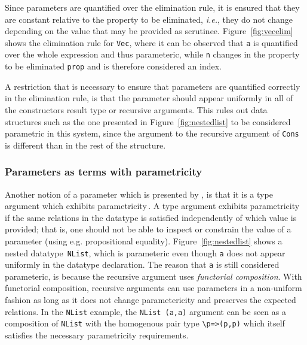 \documentclass{ituthesis}
\newcommand{\ttconstructor}[1]{\textcolor{constructor-color}{\texttt{#1}}}
\newcommand{\tttype}[1]{\textcolor{type-color}{\texttt{#1}}}
\newcommand{\ttvar}[1]{\textcolor{local-var-color}{\texttt{#1}}}
\theoremstyle{break}
\begin{document}
Since parameters are quantified over the elimination rule, it is ensured that they are constant relative to the property to be eliminated, \textit{i.e.}, they do not change depending on the value that may be provided as scrutinee.
Figure~\ref{fig:vecelim} shows the elimination rule for \tttype{Vec}, where it can be observed that \ttvar{a} is quantified over the whole expression and thus parameteric,
while \ttvar{n} changes in the property to be eliminated \ttvar{prop} and is therefore considered an index.

A restriction that is necessary to ensure that parameters are quantified correctly in the elimination rule, is that the parameter should appear uniformly in all of the constructors result type or recursive arguments.
This rules out data structures such as the one presented in Figure~\ref{fig:nestedlist} to be considered parametric in this system, since the argument to the recursive argument of \ttconstructor{Cons} is different
than in the rest of the structure.

\subsubsection{Parameters as terms with parametricity}
\label{ssub:Parameters as terms with parametricity}
Another notion of a parameter which is presented by \textcite{bernardy2010parametricity}, is that it is a type argument which exhibits parametricity\,\autocite{DBLP:conf/ifip/Reynolds83,Wadler89theoremsfor}.
A type argument exhibits parametricity if the same relations in the datatype is satisfied independently of which value is provided; that is, one should not be able to inspect or constrain the value of a parameter (using e.g. propositional equality).
Figure~\ref{fig:nestedlist} shows a nested datatype\,\autocite{bird1998nested} \tttype{NList}, which is parameteric even though \ttvar{a} does not appear uniformly in the datatype declaration.
The reason that \ttvar{a} is still considered parameteric, is because the recursive argument uses \textit{functorial composition}.
With functorial composition, recursive arguments can use parameters in a non-uniform fashion as long as it does not change parametericity and preserves the expected relations.
In the \tttype{NList} example, the \tttype{NList}~\tttype{(}\ttvar{a}\tttype{,}\ttvar{a}\tttype{)} argument can be seen as a composition of \tttype{NList} with the homogenous pair type \texttt{\textbackslash}\ttvar{p}\texttt{=>}\tttype{(}\ttvar{p}\tttype{,}\ttvar{p}\tttype{)} which itself satisfies the necessary parametricity requirements.
\end{document}
